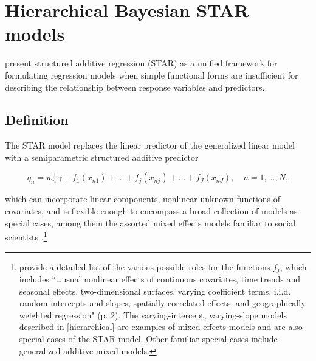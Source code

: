 \section{Hierarchical Bayesian STAR models}
\label{star}

 present structured additive regression (STAR) 
as a unified framework for formulating regression models when simple functional forms are 
insufficient for describing the relationship between response variables and predictors. 

\subsection{Definition}

%
%

The STAR model replaces the linear predictor of the 
generalized linear model with a semiparametric structured additive predictor

\begin{equation*}
  \eta_n =  w_n^\intercal\gamma + f_1(x_{n1}) + \ldots + f_j(x_{nj}) + \ldots + f_J(x_{nJ}), \quad n = 1, \dots, N, 
\end{equation*}

\noindent which can incorporate linear components, nonlinear unknown functions of covariates, 
and is flexible enough to encompass a broad collection of models as special cases, among them the 
assorted mixed effects models familiar to social scientists 
.\footnote{ 
provide a detailed list of the various possible roles for the functions $f_j$, which includes ``\dots usual 
nonlinear effects of continuous covariates, time trends and seasonal effects, two-dimensional surfaces, 
varying coefficient terms, i.i.d. random intercepts and slopes, spatially correlated effects, and geographically 
weighted regression" (p. 2). The varying-intercept, varying-slope models described in \ref{hierarchical} 
are examples of mixed effects models and are also special cases of the STAR model. Other familiar 
special cases include generalized additive mixed models.} 

